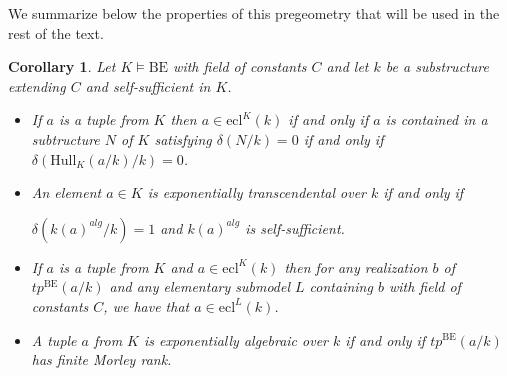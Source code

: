 \documentclass[12pt]{amsart}
\newcommand{\BE}{\mathrm{BE}}
\theoremstyle{definition}
\theoremstyle{plain}
\newtheorem{cor}[defn]{Corollary}
\theoremstyle{exampstyle}\newtheorem{thmx}{Theorem}
\theoremstyle{exampstyle}\newtheorem{thmxbis}{Theorem}
\begin{document}
We summarize below the properties of this pregeometry that will be used in the rest of the text. 
\begin{cor} \label{corollary-predimension}
Let $K \models \BE$ with field of constants $C$ and let $k$ be a substructure extending $C$ and self-sufficient in $K$.
\begin{itemize} 
\item[(i)] If $a$ is a tuple from $K$ then $a \in \mathrm{ecl}^K(k)$ if and only if $a$ is contained in a subtructure $N$ of $K$ satisfying $\delta(N/k) = 0$ if and only if $\delta(\mathrm{Hull}_K(a/k)/k) = 0$.
\item[(ii)] An element $a \in K$ is exponentially transcendental over $k$ if and only if
\begin{center} 
$\delta(k(a)^{alg}/k) = 1$ and $k(a)^{alg}$ is self-sufficient.
\end{center}
\item[(iii)] If $a$ is a tuple from $K$ and $a \in \mathrm{ecl}^{K}(k)$ then for any realization $b$ of $tp^{\BE}(a/k)$ and any elementary submodel $L$ containing $b$ with field of constants $C$, we have that $a \in \mathrm{ecl}^{L}(k)$.
\item[(iv)] A tuple $a$ from $K$ is exponentially algebraic over $k$ if and only if $tp^{\BE}(a/k)$ has finite Morley rank.
\end{itemize} 
\end{cor} 
\end{document}
